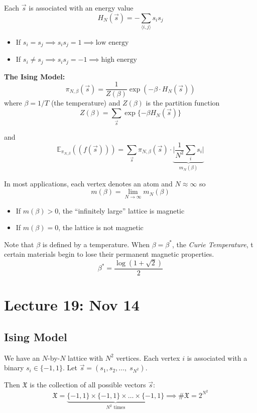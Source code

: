 \documentclass[12pt]{article}
\newcommand{\E}{\mathbb{E}}
\newcommand{\mfX}{\mathfrak{X}}
\begin{document}
        Each $\vec s$ is associated with an energy value 
        \[H_N(\vec s) = - \sum_{\langle i, j\rangle} s_i s_j\] 

        \begin{itemize}
            \item If $s_i = s_j \implies s_i s_j = 1 \implies \text{low energy}$
            \item If $s_i \neq s_j \implies s_i s_j = -1 \implies \text{high energy}$
        \end{itemize}

        \textbf{The Ising Model:}  
        \[\pi_{N, \beta}(\vec s) = \frac{1}{Z(\beta)} \exp(-\beta \cdot H_N(\vec s))\]
        where $\beta = 1/T$ (the temperature) and $Z(\beta)$ is the partition function 
        \[Z(\beta) = \sum_{\vec s} \exp\{-\beta H_N(\vec s)\}\] 

        and 
        \[\E_{\pi_{N, \beta}}((f(\vec s))) = \sum_{\vec s} \pi_{N, \beta}(\vec s) \cdot \underbrace{\bigg\vert \frac{1}{N^2} \sum_i s_i \bigg\vert}_{m_N(\beta)}\] 

        In most applications, each vertex denotes an atom and $N \approx \infty$ so 
        \[m(\beta) = \lim_{N\to \infty} m_N(\beta)\]

        \begin{itemize}
            \item If $m(\beta) > 0$, the ``infinitely large'' lattice is magnetic
            \item If $m(\beta) = 0$, the lattice is not magnetic
        \end{itemize}

        Note that $\beta$ is defined by a temperature. When $\beta = \beta^*$, the \emph{Curie Temperature},  t certain materials begin to lose their permanent magnetic properties. 
        \[\beta^* = \frac{\log(1 + \sqrt{2})}{2}\]

\section{Lecture 19: Nov 14}
    \subsection{Ising Model}
        We have an $N$-by-$N$ lattice with $N^2$ vertices. Each vertex $i$ is associated with a binary $s_i \in \{-1, 1\}$. Let $\vec s = (s_1, s_2, \dots,\; s_{N^2})$. 

        Then $\mfX$ is the collection of all possible vectors $\vec s$: 
        \[\mfX = \underbrace{\{-1, 1\}\times \{-1, 1\} \times \dots \times \{-1, 1\}}_{N^2 \text{ times}} \implies \#\mfX = 2^{N^2}\]
\end{document}
